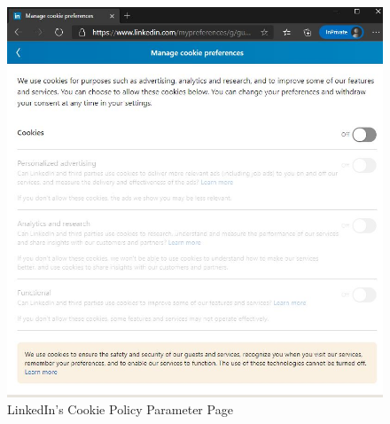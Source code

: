 \documentclass[twocolumn, letterpaper]{scrartcl}
\begin{document}
        \begin{figure}[tbp]	
        \includegraphics[width=0.9\linewidth]{ld_cn.JPG}
        \caption{LinkedIn's Cookie Policy Parameter Page \label{fig:h}}
        \end{figure}
        
\end{document}
